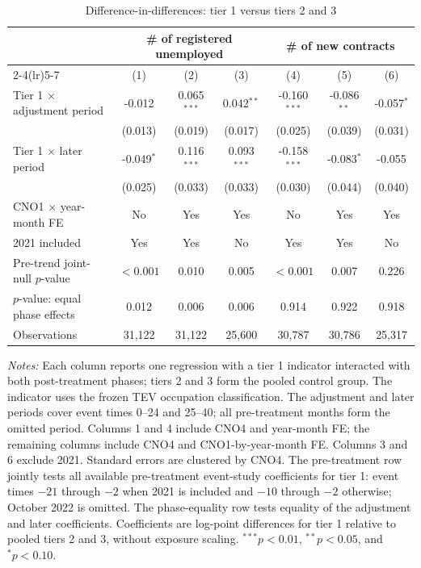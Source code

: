 \begin{table}[!htbp]
\centering
\caption{Difference-in-differences: tier 1 versus tiers 2 and 3}
\label{tab:v1_jev_job_tiers}
\begin{threeparttable}
\scriptsize
\setlength{\tabcolsep}{3.5pt}
\begin{tabular}{lcccccc}
\toprule
& \multicolumn{3}{c}{\# of registered unemployed} & \multicolumn{3}{c}{\# of new contracts} \\
\cmidrule(lr){2-4}\cmidrule(lr){5-7}
& (1) & (2) & (3) & (4) & (5) & (6) \\
\midrule
Tier 1 $\times$ adjustment period & -0.012 & 0.065$^{***}$ & 0.042$^{**}$ & -0.160$^{***}$ & -0.086$^{**}$ & -0.057$^{*}$ \\
 & (0.013) & (0.019) & (0.017) & (0.025) & (0.039) & (0.031) \\
Tier 1 $\times$ later period & -0.049$^{*}$ & 0.116$^{***}$ & 0.093$^{***}$ & -0.158$^{***}$ & -0.083$^{*}$ & -0.055 \\
 & (0.025) & (0.033) & (0.033) & (0.030) & (0.044) & (0.040) \\
\midrule
CNO1 $\times$ year-month FE & No & Yes & Yes & No & Yes & Yes \\
2021 included & Yes & Yes & No & Yes & Yes & No \\
Pre-trend joint-null $p$-value & $<0.001$ & 0.010 & 0.005 & $<0.001$ & 0.007 & 0.226 \\
$p$-value: equal phase effects & 0.012 & 0.006 & 0.006 & 0.914 & 0.922 & 0.918 \\
Observations & 31,122 & 31,122 & 25,600 & 30,787 & 30,786 & 25,317 \\
\bottomrule
\end{tabular}
\begin{tablenotes}[flushleft]
\footnotesize
\item \emph{Notes:} Each column reports one regression with a tier 1 indicator interacted with both post-treatment phases; tiers 2 and 3 form the pooled control group. The indicator uses the frozen TEV occupation classification. The adjustment and later periods cover event times 0--24 and 25--40; all pre-treatment months form the omitted period. Columns 1 and 4 include CNO4 and year-month FE; the remaining columns include CNO4 and CNO1-by-year-month FE. Columns 3 and 6 exclude 2021. Standard errors are clustered by CNO4. The pre-treatment row jointly tests all available pre-treatment event-study coefficients for tier 1: event times $-21$ through $-2$ when 2021 is included and $-10$ through $-2$ otherwise; October 2022 is omitted. The phase-equality row tests equality of the adjustment and later coefficients. Coefficients are log-point differences for tier 1 relative to pooled tiers 2 and 3, without exposure scaling. $^{***}p<0.01$, $^{**}p<0.05$, and $^{*}p<0.10$.
\end{tablenotes}
\end{threeparttable}
\end{table}
